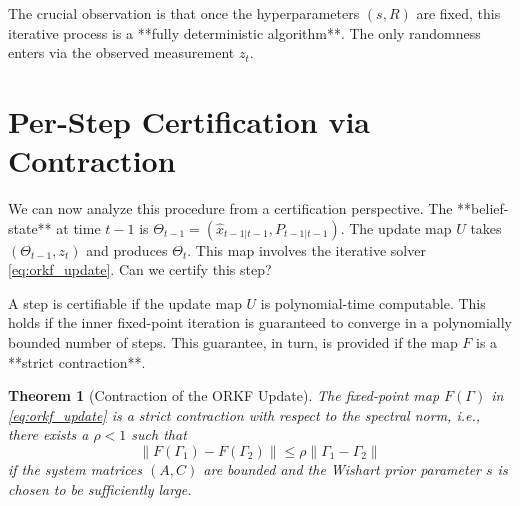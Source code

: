 \documentclass[12pt]{article}
\theoremstyle{definition}
\theoremstyle{plain}
\newtheorem{theorem}{Theorem}[section]
\begin{document}
The crucial observation is that once the hyperparameters $(s, R)$ are fixed, this iterative process is a **fully deterministic algorithm**. The only randomness enters via the observed measurement $z_t$.

\section{Per-Step Certification via Contraction}
We can now analyze this procedure from a certification perspective. The **belief-state** at time $t-1$ is $\Theta_{t-1} = (\hat{x}_{t-1|t-1}, P_{t-1|t-1})$. The update map $U$ takes $(\Theta_{t-1}, z_t)$ and produces $\Theta_t$. This map involves the iterative solver \eqref{eq:orkf_update}. Can we certify this step?

A step is certifiable if the update map $U$ is polynomial-time computable. This holds if the inner fixed-point iteration is guaranteed to converge in a polynomially bounded number of steps. This guarantee, in turn, is provided if the map $F$ is a **strict contraction**.

\begin{theorem}[Contraction of the ORKF Update]
The fixed-point map $F(\Gamma)$ in \eqref{eq:orkf_update} is a strict contraction with respect to the spectral norm, i.e., there exists a $\rho < 1$ such that
\[
\| F(\Gamma_1) - F(\Gamma_2) \| \le \rho \| \Gamma_1 - \Gamma_2 \|
\]
if the system matrices $(A,C)$ are bounded and the Wishart prior parameter $s$ is chosen to be sufficiently large.
\end{theorem}
\end{document}

